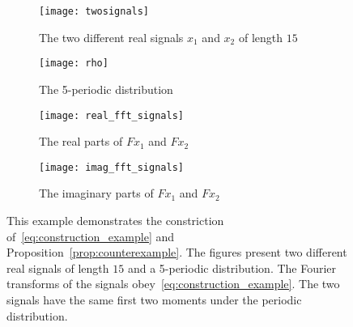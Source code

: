 \documentclass{IEEEtran}
\numberwithin{equation}{section}
\numberwithin{figure}{section}
\theoremstyle{plain}
\theoremstyle{definition}
\theoremstyle{remark}
\theoremstyle{plain}
\theoremstyle{remark}
\theoremstyle{plain}
\theoremstyle{plain}
\theoremstyle{remark}
\newcommand{\F}{F}
\begin{document}
\begin{figure*}[ht]
    \centering
    \begin{subfigure}[t]{0.22\textwidth}
        \texttt{[image: twosignals]}
        \caption{The two different real signals $x_1$ and $x_2$ of length $15$}    \label{fig:two_signals}
    \end{subfigure}   \quad
    \begin{subfigure}[t]{0.22\textwidth}
        \texttt{[image: rho]}
        \caption{The 5-periodic distribution} \label{fig:periodic_rho}
    \end{subfigure}      \quad
    \begin{subfigure}[t]{0.22\textwidth}
        \texttt{[image: real\_fft\_signals]}
        \caption{The real parts of $\F x_1$ and $\F x_2$}    \label{fig:real_part}
    \end{subfigure}  \quad
    \begin{subfigure}[t]{0.22\textwidth}
        \texttt{[image: imag\_fft\_signals]}
        \caption{The imaginary parts of $\F x_1$ and $\F x_2$}    \label{fig:image_part}
    \end{subfigure}  
    \caption{\label{fig: example_construction}This example demonstrates the constriction of~\eqref{eq:construction_example} and Proposition~\ref{prop:counterexample}. The figures present two different real signals of length $15$ and a 5-periodic distribution. The Fourier transforms of the signals obey~\eqref{eq:construction_example}. 
        The two signals have the same first two moments under the periodic distribution. } 
\end{figure*}
\end{document}
